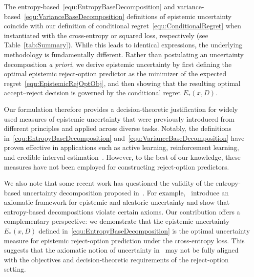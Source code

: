 \vspace{-0.15cm}

The entropy-based~\eqref{equ:EntropyBaseDecomposition} and variance-based~\eqref{equ:VarianceBaseDecomposition} definitions of epistemic uncertainty coincide with our definition of conditional regret~\eqref{equ:ConditionalRegret} when instantiated with the cross-entropy or squared loss, respectively (see Table~\ref{tab:Summary}). While this leads to identical expressions, the underlying methodology is fundamentally different. Rather than postulating an uncertainty decomposition \emph{a priori}, we derive epistemic uncertainty by first defining the optimal epistemic reject-option predictor as the minimizer of the expected regret~\eqref{equ:EpistemicRejOptObj}, and then showing that the resulting optimal accept–reject decision is governed by the conditional regret $E_*(x,D)$.

\vspace{-0.15cm}

Our formulation therefore provides a decision-theoretic justification for widely used measures of epistemic uncertainty that were previously introduced from different principles and applied across diverse tasks. Notably, the definitions in~\eqref{equ:EntropyBaseDecomposition} and~\eqref{equ:VarianceBaseDecomposition} have proven effective in applications such as active learning, reinforcement learning, and credible interval estimation~\cite{Depeweg-Decompos-ICML2018,Wang-EpistQuant-CVPR2024}. However, to the best of our knowledge, these measures have not been employed for constructing reject-option predictors.

\vspace{-0.15cm}

We also note that some recent work has questioned the validity of the entropy-based uncertainty decomposition proposed in~\cite{Depeweg-Decompos-ICML2018}. For example,~\cite{Wimmer-Proper-CUAI2023} introduce an axiomatic framework for epistemic and aleatoric uncertainty and show that entropy-based decompositions violate certain axioms. Our contribution offers a complementary perspective: we demonstrate that the epistemic uncertainty $E_*(x, D)$ defined in~\eqref{equ:EntropyBaseDecomposition} is the optimal uncertainty measure for epistemic reject-option prediction under the cross-entropy loss. This suggests that the axiomatic notion of uncertainty in~\cite{Wimmer-Proper-CUAI2023} may not be fully aligned with the objectives and decision-theoretic requirements of the reject-option setting.

\vspace{-0.1cm}

